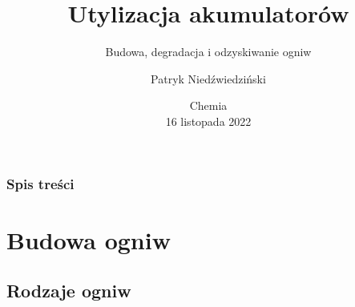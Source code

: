 \documentclass[
	11pt, %
]{beamer}
\title[Utylizacja akumulatorów]{Utylizacja akumulatorów} %
\subtitle{Budowa, degradacja i odzyskiwanie ogniw} %
\author[P. Niedźwiedziński]{Patryk Niedźwiedziński}
\institute[PUT]{Politechnika Poznańska \\ \smallskip Wydział Inżynierii Środowiska i Energetyki}
\date[16.11.2022]{Chemia \\ 16 listopada 2022}
\begin{document}

\begin{frame}
	\titlepage %
\end{frame}



\begin{frame}
	\frametitle{Spis treści} %
	
	\tableofcontents %
\end{frame}


\section{Budowa ogniw}

\subsection{Rodzaje ogniw}
\end{document}
